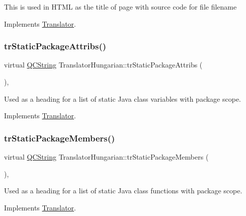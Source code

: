 This is used in H\+T\+ML as the title of page with source code for file filename 

Implements \mbox{\hyperlink{class_translator}{Translator}}.

\mbox{\label{class_translator_hungarian_ac304495a33d2a8945bbdafd1d5ee8153}} 
\subsubsection{\texorpdfstring{trStaticPackageAttribs()}{trStaticPackageAttribs()}}
{\footnotesize\ttfamily virtual \mbox{\hyperlink{class_q_c_string}{Q\+C\+String}} Translator\+Hungarian\+::tr\+Static\+Package\+Attribs (\begin{DoxyParamCaption}{ }\end{DoxyParamCaption})\hspace{0.3cm}{\ttfamily [inline]}, {\ttfamily [virtual]}}

Used as a heading for a list of static Java class variables with package scope. 

Implements \mbox{\hyperlink{class_translator}{Translator}}.

\mbox{\label{class_translator_hungarian_abae14bcc60a90b960f60b70fdd33be6f}} 
\subsubsection{\texorpdfstring{trStaticPackageMembers()}{trStaticPackageMembers()}}
{\footnotesize\ttfamily virtual \mbox{\hyperlink{class_q_c_string}{Q\+C\+String}} Translator\+Hungarian\+::tr\+Static\+Package\+Members (\begin{DoxyParamCaption}{ }\end{DoxyParamCaption})\hspace{0.3cm}{\ttfamily [inline]}, {\ttfamily [virtual]}}

Used as a heading for a list of static Java class functions with package scope. 

Implements \mbox{\hyperlink{class_translator}{Translator}}.


